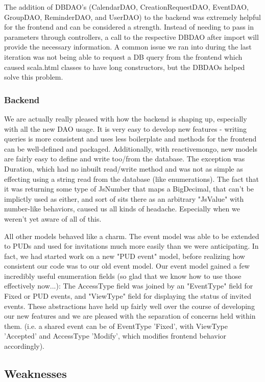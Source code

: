 \documentclass{article}
\begin{document}
The addition of DBDAO’s (CalendarDAO, CreationRequestDAO, EventDAO, GroupDAO, ReminderDAO,  and UserDAO) to the backend was extremely helpful for the frontend and can be considered a strength. Instead of needing to pass in parameters through controllers, a call to the respective DBDAO after import will provide the necessary information. A common issue we ran into during the last iteration was not being able to request a DB query from the frontend which caused scala.html classes to have long constructors, but the DBDAOs helped solve this problem.  

\subsubsection{Backend}
We are actually really pleased with how the backend is shaping up, especially with all the new DAO usage. It is very easy to develop new features - writing queries is more consistent and uses less boilerplate and methods for the frontend can be well-defined and packaged. Additionally, with reactivemongo, new models are fairly easy to define and write too/from the database. The exception was Duration, which had no inbuilt read/write method and was not as simple as effecting using a string read from the database (like enumerations). The fact that it was returning some type of JsNumber that maps a BigDecimal, that can't be implictly used as either, and sort of sits there as an arbitrary "JsValue" with number-like behaviors, caused us all kinds of headache. Especially when we weren't yet aware of all of this.

All other models behaved like a charm. The event model was able to be extended to PUDs and used for invitations much more easily than we were anticipating. In fact, we had started work on a new "PUD event" model, before realizing how consistent our code was to our old event model. Our event model gained a few incredibly useful enumeration fields (so glad that we know how to use those effectively now...): The AccessType field was joined by an "EventType" field for Fixed or PUD events, and "ViewType" field for displaying the status of invited events. These abstractions have held up fairly well over the course of developing our new features and we are pleased with the separation of concerns held within them. (i.e. a shared event can be of EventType 'Fixed', with ViewType 'Accepted' and AccessType 'Modify', which modifies frontend behavior accordingly).

\subsection{Weaknesses}
\end{document}
